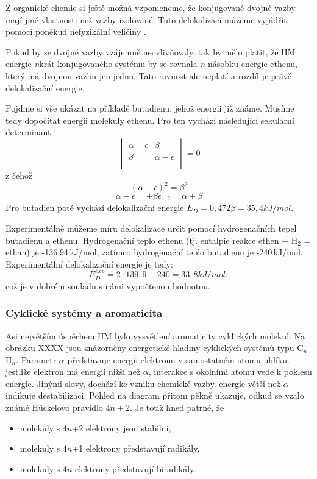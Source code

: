 Z organické chemie si ještě možná vzpomeneme, že konjugované dvojné vazby mají jiné vlastnosti než vazby izolované.
Tuto delokalizaci můžeme vyjádřit pomocí poněkud nefyzikální veličiny .

Pokud by se dvojné vazby vzájemně neovlivňovaly, tak by mělo platit, že HM energie
\textit{n}krát-konjugovaného systému by se rovnala \textit{n}-násobku energie ethenu, který má dvojnou vazbu jen jednu. Tato rovnost ale neplatí a rozdíl je právě delokalizační energie. 

Pojďme si vše ukázat na příkladě butadienu, jehož energii již známe. Musíme tedy dopočítat energii molekuly ethenu. Pro ten vychází následující sekulární determinant. 
\begin{equation}
\begin{vmatrix}
\alpha - \epsilon & \beta \\
\beta & \alpha - \epsilon \\
\end{vmatrix}
=0
\end{equation}
z čehož
$$
(\alpha-\epsilon)^2=\beta^2
$$
$$
\alpha - \epsilon = \pm \beta
\epsilon_{1,2}= \alpha\pm \beta
$$
Pro butadien poté vychází delokalizační energie $E_D=0,472\beta=35,4 kJ/mol$.


Experimentálně můžeme míru delokalizace určit pomocí hydrogenačních tepel butadienu a ethenu.
Hydrogenační teplo ethenu (tj. entalpie reakce ethen + H$_2$ = ethan) je -136,94\,kJ/mol, zatímco hydrogenační teplo butadienu je -240\,kJ/mol. Experimentální delokalizační energie je tedy:
$$
E_D^{exp}=2\cdot139,9-240 = 33,8 kJ/mol,
$$
což je v dobrém souladu s námi vypočtenou hodnotou.

\subsubsection{Cyklické systémy a aromaticita}

Asi největším úspěchem HM bylo vysvětlení aromaticity cyklických molekul. Na obrázku XXXX jsou znázorněny energetické hladiny cyklických systémů typu C$_n$H$_n$. Parametr $\alpha$ představuje energii elektronu v samostatném atomu uhlíku. jestliže elektron má energii nižší než  $\alpha$, interakce s okolními atomu vede k poklesu energie. Jinými slovy, dochází ke vzniku chemické vazby. energie větši než $\alpha$ indikuje destabilizaci. Pohled na diagram přitom pěkně ukazuje, odkud se vzalo známé  H\"{u}ckelovo pravidlo $4n+2$. Je totiž hned patrné, že

\begin{itemize}
\item molekuly s 4$n$+2 elektrony jsou stabilní,
\item molekuly s 4$n$+1 elektrony představují radikály,
\item molekuly s 4$n$ elektrony představují biradikály.
\end{itemize}


